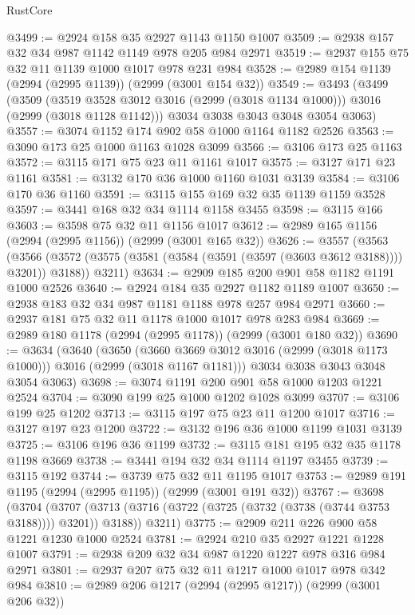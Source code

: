 \begin{lexlean}{RustCore}
\begin{coremodule}
@3499 := @2924 @158 @35 @2927 @1143 @1150 @1007
@3509 := @2938 @157 @32 @34 @987 @1142 @1149 @978 @205 @984 @2971
@3519 := @2937 @155 @75 @32 @11 @1139 @1000 @1017 @978 @231 @984
@3528 := @2989 @154 @1139 (@2994 (@2995 @1139)) (@2999 (@3001 @154 @32))
@3549 := @3493
    (@3499
      (@3509
        (@3519 @3528 @3012 @3016 (@2999 (@3018 @1134 @1000)))
        @3016
        (@2999 (@3018 @1128 @1142)))
      @3034
      @3038
      @3043
      @3048
      @3054
      @3063)
@3557 := @3074 @1152 @174 @902 @58 @1000 @1164 @1182 @2526
@3563 := @3090 @173 @25 @1000 @1163 @1028 @3099
@3566 := @3106 @173 @25 @1163
@3572 := @3115 @171 @75 @23 @11 @1161 @1017
@3575 := @3127 @171 @23 @1161
@3581 := @3132 @170 @36 @1000 @1160 @1031 @3139
@3584 := @3106 @170 @36 @1160
@3591 := @3115 @155 @169 @32 @35 @1139 @1159 @3528
@3597 := @3441 @168 @32 @34 @1114 @1158 @3455
@3598 := @3115 @166
@3603 := @3598 @75 @32 @11 @1156 @1017
@3612 := @2989 @165 @1156 (@2994 (@2995 @1156)) (@2999 (@3001 @165 @32))
@3626 := @3557
    (@3563
      (@3566 (@3572 (@3575 (@3581 (@3584 (@3591 (@3597 (@3603 @3612 @3188)))) @3201)) @3188))
      @3211)
@3634 := @2909 @185 @200 @901 @58 @1182 @1191 @1000 @2526
@3640 := @2924 @184 @35 @2927 @1182 @1189 @1007
@3650 := @2938 @183 @32 @34 @987 @1181 @1188 @978 @257 @984 @2971
@3660 := @2937 @181 @75 @32 @11 @1178 @1000 @1017 @978 @283 @984
@3669 := @2989 @180 @1178 (@2994 (@2995 @1178)) (@2999 (@3001 @180 @32))
@3690 := @3634
    (@3640
      (@3650
        (@3660 @3669 @3012 @3016 (@2999 (@3018 @1173 @1000)))
        @3016
        (@2999 (@3018 @1167 @1181)))
      @3034
      @3038
      @3043
      @3048
      @3054
      @3063)
@3698 := @3074 @1191 @200 @901 @58 @1000 @1203 @1221 @2524
@3704 := @3090 @199 @25 @1000 @1202 @1028 @3099
@3707 := @3106 @199 @25 @1202
@3713 := @3115 @197 @75 @23 @11 @1200 @1017
@3716 := @3127 @197 @23 @1200
@3722 := @3132 @196 @36 @1000 @1199 @1031 @3139
@3725 := @3106 @196 @36 @1199
@3732 := @3115 @181 @195 @32 @35 @1178 @1198 @3669
@3738 := @3441 @194 @32 @34 @1114 @1197 @3455
@3739 := @3115 @192
@3744 := @3739 @75 @32 @11 @1195 @1017
@3753 := @2989 @191 @1195 (@2994 (@2995 @1195)) (@2999 (@3001 @191 @32))
@3767 := @3698
    (@3704
      (@3707 (@3713 (@3716 (@3722 (@3725 (@3732 (@3738 (@3744 @3753 @3188)))) @3201)) @3188))
      @3211)
@3775 := @2909 @211 @226 @900 @58 @1221 @1230 @1000 @2524
@3781 := @2924 @210 @35 @2927 @1221 @1228 @1007
@3791 := @2938 @209 @32 @34 @987 @1220 @1227 @978 @316 @984 @2971
@3801 := @2937 @207 @75 @32 @11 @1217 @1000 @1017 @978 @342 @984
@3810 := @2989 @206 @1217 (@2994 (@2995 @1217)) (@2999 (@3001 @206 @32))

\end{coremodule}
\end{lexlean}
